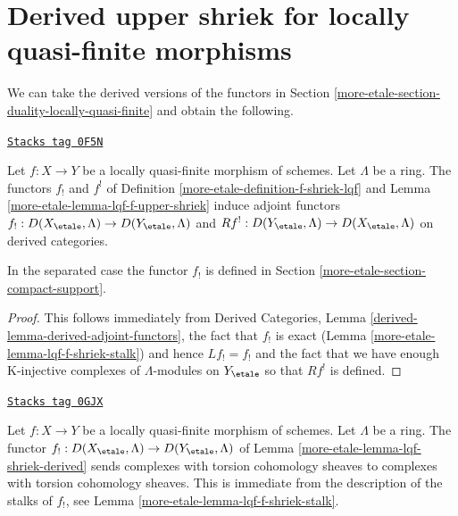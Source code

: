 \section{Derived upper shriek for locally quasi-finite morphisms}
\label{more-etale-section-derived-duality-locally-quasi-finite}
We can take the derived versions of the functors in
Section \ref{more-etale-section-duality-locally-quasi-finite}
and obtain the following.

\begin{lemma}
\label{more-etale-lemma-lqf-shriek-derived}
\href{https://stacks.math.columbia.edu/tag/0F5N}{\texttt{Stacks tag 0F5N}}

Let $f : X \to Y$ be a locally quasi-finite morphism of schemes.
Let $\Lambda$ be a ring. The functors $f_!$ and $f^!$ of
Definition \ref{more-etale-definition-f-shriek-lqf} and
Lemma \ref{more-etale-lemma-lqf-f-upper-shriek}
induce adjoint functors $f_! : D(X_\etale, \Lambda) \to D(Y_\etale, \Lambda)$
and $Rf^! : D(Y_\etale, \Lambda) \to D(X_\etale, \Lambda)$
on derived categories.
\end{lemma}

In the separated case the functor $f_!$ is defined in
Section \ref{more-etale-section-compact-support}.

\begin{proof}
This follows immediately from
Derived Categories, Lemma \ref{derived-lemma-derived-adjoint-functors},
the fact that $f_!$ is exact (Lemma \ref{more-etale-lemma-lqf-f-shriek-stalk})
and hence $Lf_! = f_!$
and the fact that we have enough K-injective complexes of $\Lambda$-modules
on $Y_\etale$ so that $Rf^!$ is defined.
\end{proof}

\begin{remark}
\label{more-etale-remark-lqf-shriek-derived-torsion}
\href{https://stacks.math.columbia.edu/tag/0GJX}{\texttt{Stacks tag 0GJX}}

Let $f : X \to Y$ be a locally quasi-finite morphism of schemes. Let
$\Lambda$ be a ring. The functor
$f_! : D(X_\etale, \Lambda) \to D(Y_\etale, \Lambda)$ of
Lemma \ref{more-etale-lemma-lqf-shriek-derived}
sends complexes with torsion cohomology sheaves
to complexes with torsion cohomology sheaves.
This is immediate from the description of the stalks of $f_!$,
see Lemma \ref{more-etale-lemma-lqf-f-shriek-stalk}.
\end{remark}

